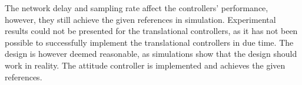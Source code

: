 The network delay and sampling rate affect the controllers' performance, however, they still achieve the given references in simulation. Experimental results could not be presented for the translational controllers, as it has not been possible to successfully implement the translational controllers in due time. The design is however deemed reasonable, as simulations show that the design should work in reality. The attitude controller is implemented and achieves the given references. 
%
